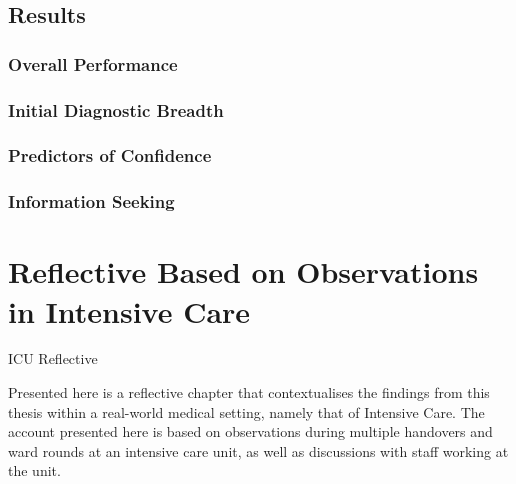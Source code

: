 \documentclass[a4paper, nobind]{templates/ociamthesis}
\begin{document}
\hypertarget{results-2}{%
\section*{Results}\label{results-2}}

\hypertarget{overall-performance-1}{%
\subsection*{Overall Performance}\label{overall-performance-1}}

\hypertarget{initial-diagnostic-breadth}{%
\subsection*{Initial Diagnostic Breadth}\label{initial-diagnostic-breadth}}

\hypertarget{predictors-of-confidence}{%
\subsection*{Predictors of Confidence}\label{predictors-of-confidence}}

\hypertarget{information-seeking-2}{%
\subsection*{Information Seeking}\label{information-seeking-2}}

\hypertarget{reflective-based-on-observations-in-intensive-care}{%
\chapter*{Reflective Based on Observations in Intensive Care}\label{reflective-based-on-observations-in-intensive-care}}

\adjustmtc
{}

ICU Reflective

Presented here is a reflective chapter that contextualises the findings from this thesis within a real-world medical setting, namely that of Intensive Care. The account presented here is based on observations during multiple handovers and ward rounds at an intensive care unit, as well as discussions with staff working at the unit.
\end{document}
